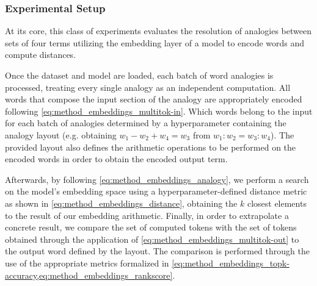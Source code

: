 \subsubsection{Experimental Setup}\label{sssec:exp_emb_exp1_expset}

At its core, this class of experiments evaluates the resolution of analogies between sets of four terms utilizing the embedding layer of a model to encode words and compute distances.

Once the dataset and model are loaded, each batch of word analogies is processed, treating every single analogy as an independent computation.
All words that compose the input section of the analogy are appropriately encoded following \cref{eq:method_embeddings_multitok-in}.
Which words belong to the input for each batch of analogies  determined by a hyperparameter containing the analogy layout (e.g. obtaining $w_1 - w_2 + w_4 = w_3$ from $w_1 : w_2 = w_3 : w_4$).
The provided layout also defines the arithmetic operations to be performed on the encoded words in order to obtain the encoded output term.

Afterwards, by following \cref{eq:method_embeddings_analogy}, we perform a search on the model's embedding space using a hyperparameter-defined distance metric as shown in \cref{eq:method_embeddings_distance}, obtaining the $k$ closest elements to the result of our embedding arithmetic.
Finally, in order to extrapolate a concrete result, we compare the set of computed tokens with the set of tokens obtained through the application of \cref{eq:method_embeddings_multitok-out} to the output word defined by the layout.
The comparison is performed through the use of the appropriate metrics formalized in \cref{eq:method_embeddings_topk-accuracy,eq:method_embeddings_rankscore}.

